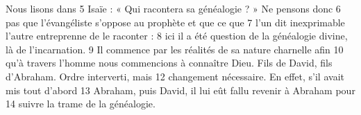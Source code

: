 Nous lisons dans	 
5	 	Isaïe : « Qui racontera sa généalogie ? » Ne pensons donc	 
6	 	pas que l'évangéliste s'oppose au prophète et que ce que	 
7	 	l'un dit inexprimable l'autre entreprenne de le raconter :	 
8	 	ici il a été question de la généalogie divine, là de l'incarnation.	 
9	 	Il commence par les réalités de sa nature charnelle afin	 
10	 	qu'à travers l'homme nous commencions à connaître Dieu.
Fils de David, fils d'Abraham. Ordre interverti, mais	 
12	 	changement nécessaire. En effet, s'il avait mis tout d'abord	 
13	 	Abraham, puis David, il lui eût fallu revenir à Abraham pour	 
14	 	suivre la trame de la généalogie.